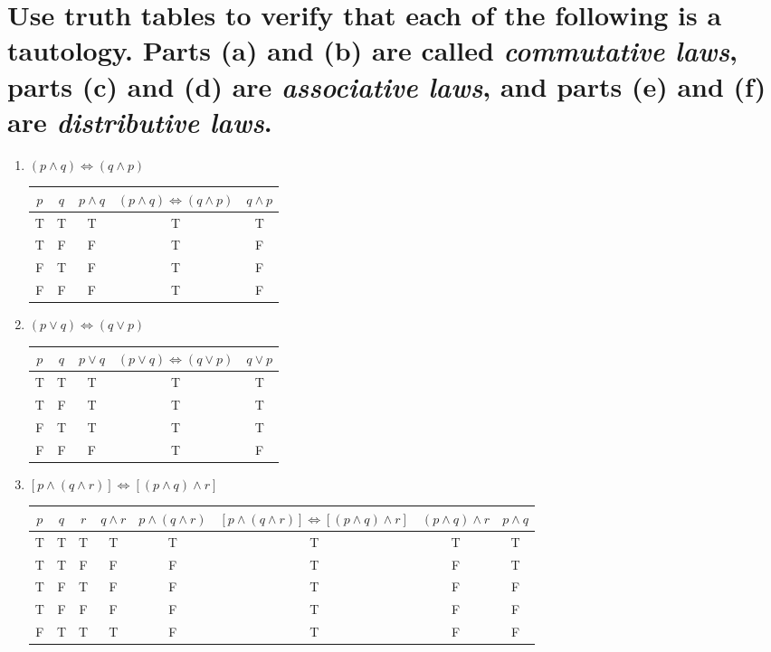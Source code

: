\documentclass[11pt]{article} %
\begin{document}
\section{Use truth tables to verify that each of the following is a tautology. Parts (a) and (b) are called \textit{commutative laws}, parts (c) and (d) are \textit{associative laws}, and parts (e) and (f) are \textit{distributive laws}.}
\begin{enumerate}
	\item $(p \land q) \iff (q \land p)$
	\begin{center}
	\begin{tabular}{|c|c|c|c|c|}
	\hline
	$p$ & $q$ & $p \land q$ & $(p \land q) \iff (q \land p)$ & $q \land p$\\
	\hline
	T & T & T & T & T\\
	T & F & F & T & F\\
	F & T & F & T & F\\
	F & F & F & T & F\\
	\hline
	\end{tabular}
	\end{center}
	\item $(p \lor q) \iff (q \lor p)$
	\begin{center}
	\begin{tabular}{|c|c|c|c|c|}
	\hline
	$p$ & $q$ & $p \lor q$ & $(p \lor q) \iff (q \lor p)$ & $q \lor p$\\
	\hline
	T & T & T & T & T\\
	T & F & T & T & T\\
	F & T & T & T & T\\
	F & F & F & T & F\\
	\hline
	\end{tabular}
	\end{center}
	\item $[p \land (q \land r)] \iff [(p\land q) \land r]$
	\begin{center}
	\begin{tabular}{|c|c|c|c|c|c|c|c|}
	\hline
	$p$ & $q$ & $r$ & $q \land r$ & $p \land (q \land r)$ & $[p \land (q \land r)] \iff [(p\land q) \land r]$ & $(p\land q) \land r$ & $p \land q$\\
	\hline
	T & T & T & T & T & T & T & T\\
	T & T & F & F & F & T & F & T\\
	T & F & T & F & F & T & F & F\\
	T & F & F & F & F & T & F & F\\
	F & T & T & T & F & T & F & F\\

\end{tabular}
\end{center}
\end{enumerate}
\end{document}
